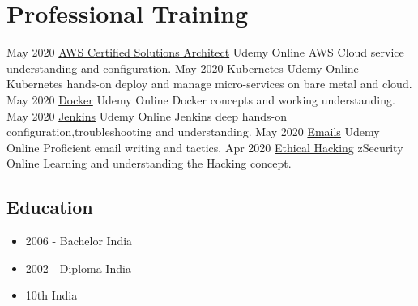 \documentclass[]{cv-style} %
\begin{document}
\section{Professional Training}
\begin{entrylist}
\entry
{May 2020}
{\href{https://www.udemy.com/certificate/}{AWS Certified Solutions Architect}}
{Udemy Online}
{AWS Cloud service understanding and configuration.}
\entry
{May 2020}
{\href{https://www.udemy.com/certificate/}{Kubernetes}}
{Udemy Online}
{Kubernetes hands-on deploy and manage micro-services on bare metal and cloud.}
\entry
{May 2020}
{\href{https://www.udemy.com/certificate/}{Docker}}
{Udemy Online}
{Docker concepts and working understanding.}
\entry
{May 2020}
{\href{https://www.udemy.com/certificate/}{Jenkins}}
{Udemy Online}
{Jenkins deep hands-on configuration,troubleshooting and understanding.}
\entry
{May 2020}
{\href{https://www.udemy.com/certificate/}{Emails}}
{Udemy Online}
{Proficient email writing and tactics.}
\entry
{Apr 2020}
{\href{https://zsecurity.org/}{Ethical Hacking}}
{zSecurity Online}
{Learning and understanding the Hacking concept.}
\end{entrylist}
\begin{aside2}
\section{Education}
\begin{itemize}
\item 2006 - Bachelor 
India
\item 2002 - Diploma  
India
\item 10th  
India 
\end{itemize}
\end{aside2}
\end{document}
